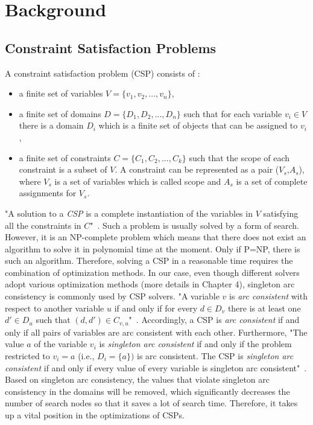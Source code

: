 \chapter{Background}
\label{cha:background}
\section{Constraint Satisfaction Problems}
A constraint satisfaction problem (CSP) consists of \cite{r18}:
\begin{itemize}
  \item a finite set of variables $V = \{{v_{1}, v_{2},..., v_{n}}\}$,
  \item a finite set of domains $D = \{D_{1}, D_{2},..., D_{n}\}$ such that for each
variable $v_{i} \in V$ there is a domain $D_{i}$ which is a finite set of objects that can be assigned to $v_{i}$,
  \item a finite set of constraints $C = \{C_{1}, C_{2},..., C_{k}\}$ such that the scope of each constraint is a subset of $V$. A constraint can be represented as a pair ($V_{s}$,$A_{s}$), where $V_{s}$ is a set of variables which is called scope and $A_{s}$ is a set of complete assignments for $V_{s}$.
\end{itemize}
"A solution to a \emph{CSP} is a complete instantiation of the variables in $V$ satisfying all the constraints in $C$"~\cite{r18}. Such a problem is usually solved by a form of search. However, it is an NP-complete problem which means that there does not exist an algorithm to solve it in polynomial time at the moment. Only if P=NP, there is such an algorithm. Therefore, solving a CSP in a reasonable time requires the combination of optimization methods. In our case, even though different solvers adopt various optimization methods (more details in Chapter 4), singleton arc consistency is commonly used by CSP solvers. "A variable $v$ is \emph{arc consistent} with respect to another variable $u$ if and only if for every $d \in D_{v}$ there is at least one $d'\in D_{u}$ such that $(d,d')\in C_{v,u}$"~\cite{r7}. Accordingly, a CSP is \emph{arc consistent} if and only if all pairs of variables are arc consistent with each other. Furthermore, "The value $a$ of the variable $v_{i}$ is \emph{singleton arc consistent} if and only if the problem restricted to $v_{i}=a$ (i.e., $D_{i}=\{a\})$ is arc consistent. The CSP is \emph{singleton arc consistent} if and only if every value of every variable is singleton arc consistent"~\cite{r30}.
Based on singleton arc consistency, the values that violate singleton arc consistency in the domains will be removed, which significantly decreases the number of search nodes so that it saves a lot of search time. Therefore, it takes up a vital position in the optimizations of CSPs. 
